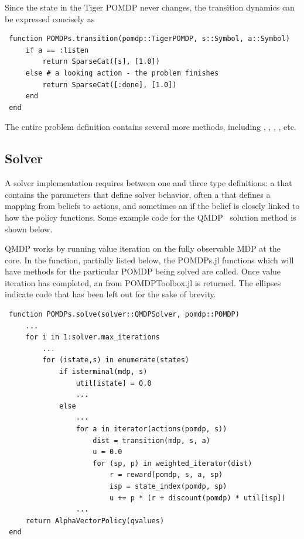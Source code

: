 Since the state in the Tiger POMDP never changes, the transition dynamics can be expressed concisely as
\begin{lstlisting}
 function POMDPs.transition(pomdp::TigerPOMDP, s::Symbol, a::Symbol)
     if a == :listen
         return SparseCat([s], [1.0]) 
     else # a looking action - the problem finishes
         return SparseCat([:done], [1.0])
     end
 end
\end{lstlisting}

The entire problem definition contains several more methods, including , , , , etc.

\subsection{Solver} 

A solver implementation requires between one and three type definitions: a  that contains the parameters that define solver behavior, often a  that defines a mapping from beliefs to actions, and sometimes an  if the belief is closely linked to how the policy functions.
Some example code for the QMDP~\citep{littman1995} solution method is shown below.

QMDP works by running value iteration on the fully observable MDP at the core.
In the  function, partially listed below, the POMDPs.jl functions which will have methods for the particular POMDP being solved are called.
Once value iteration has completed, an  from POMDPToolbox.jl is returned.
The ellipses indicate code that has been left out for the sake of brevity.

\begin{lstlisting}
 function POMDPs.solve(solver::QMDPSolver, pomdp::POMDP)
     ...
     for i in 1:solver.max_iterations
         ...
         for (istate,s) in enumerate(states)
             if isterminal(mdp, s)
                 util[istate] = 0.0
                 ...
             else
                 ...
                 for a in iterator(actions(pomdp, s))
                     dist = transition(mdp, s, a)
                     u = 0.0
                     for (sp, p) in weighted_iterator(dist)
                         r = reward(pomdp, s, a, sp)
                         isp = state_index(pomdp, sp)
                         u += p * (r + discount(pomdp) * util[isp])
                 ...
     return AlphaVectorPolicy(qvalues)
 end
\end{lstlisting}

